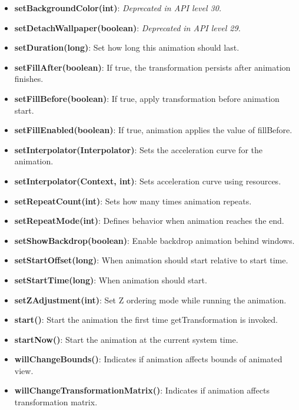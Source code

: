 \documentclass{report}
\begin{document}
\begin{itemize}
\begin{itemize}
                \item \textbf{setBackgroundColor(int)}: \textit{Deprecated in API level 30.}
                \item \textbf{setDetachWallpaper(boolean)}: \textit{Deprecated in API level 29.}
                \item \textbf{setDuration(long)}: Set how long this animation should last.
                \item \textbf{setFillAfter(boolean)}: If true, the transformation persists after animation finishes.
                \item \textbf{setFillBefore(boolean)}: If true, apply transformation before animation start.
                \item \textbf{setFillEnabled(boolean)}: If true, animation applies the value of fillBefore.
                \item \textbf{setInterpolator(Interpolator)}: Sets the acceleration curve for the animation.
                \item \textbf{setInterpolator(Context, int)}: Sets acceleration curve using resources.
                \item \textbf{setRepeatCount(int)}: Sets how many times animation repeats.
                \item \textbf{setRepeatMode(int)}: Defines behavior when animation reaches the end.
                \item \textbf{setShowBackdrop(boolean)}: Enable backdrop animation behind windows.
                \item \textbf{setStartOffset(long)}: When animation should start relative to start time.
                \item \textbf{setStartTime(long)}: When animation should start.
                \item \textbf{setZAdjustment(int)}: Set Z ordering mode while running the animation.
                \item \textbf{start()}: Start the animation the first time getTransformation is invoked.
                \item \textbf{startNow()}: Start the animation at the current system time.
                \item \textbf{willChangeBounds()}: Indicates if animation affects bounds of animated view.
                \item \textbf{willChangeTransformationMatrix()}: Indicates if animation affects transformation matrix.
            \end{itemize}

\end{itemize}
\end{document}
